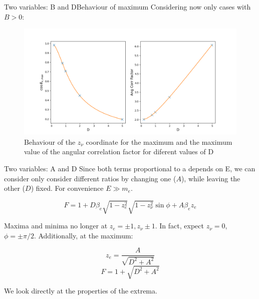 \documentclass{beamer}
\begin{document}
\begin{frame}{Two variables: B and D}{Behaviour of maximum}
	Considering now only cases with $B > 0$:
	\begin{figure}
		\centering
		\includegraphics[width=0.8\paperwidth]{plots/BD_max_behaviour}
		\caption{Behaviour of the $z_\nu$ coordinate for the maximum and the maximum value of the angular correlation factor for diferent values of D}
	\end{figure}
\end{frame}
\begin{frame}{Two variables: A and D}
	Since both terms proportional to a depends on E, we can consider only consider different ratios by changing one ($A$), while leaving the other ($D$) fixed. For convenience $E \gg m_e$.

	$$F = 1 + D\beta_e\sqrt{1-z^2_e}\sqrt{1-z^2_\nu}\sin \phi + A\beta_ez_e$$
	
	Maxima and minima no longer at $z_e=\pm1,z_\nu \pm1$. In fact, expect $z_\nu = 0$, $\phi = \pm\pi/2$. Additionally, at the maximum:
	
	$$z_e = \frac A{\sqrt{D^2+A^2}}$$
	$$F = 1 + \sqrt{D^2+A^2}$$    

	We look directly at the properties of the extrema.
\end{frame}
\end{document}

